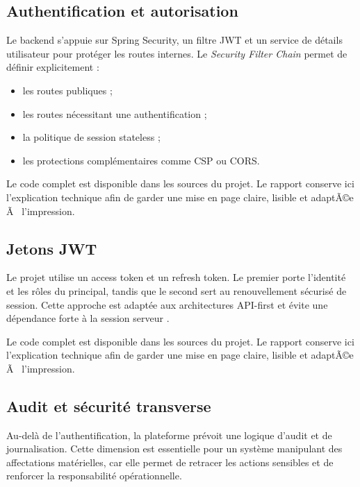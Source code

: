 ﻿\documentclass[12pt,a4paper,oneside]{report}
\newenvironment{codeblock}[1][]{
  \par
  \captionsetup{type=figure}
}{
  \par
}
\begin{document}
\subsection{Authentification et autorisation}
Le backend s'appuie sur Spring Security, un filtre JWT et un service de détails utilisateur pour protéger les routes internes. Le \textit{Security Filter Chain} permet de définir explicitement :
\begin{itemize}
  \item les routes publiques ;
  \item les routes nécessitant une authentification ;
  \item la politique de session stateless ;
  \item les protections complémentaires comme CSP ou CORS.
\end{itemize}

\begin{codeblock}[H]
\caption{Configuration de sécurité du backend}
\begin{keybox}
Le code complet est disponible dans les sources du projet. Le rapport conserve ici l'explication technique afin de garder une mise en page claire, lisible et adaptÃ©e Ã  l'impression.
\end{keybox}
\end{codeblock}

\subsection{Jetons JWT}
Le projet utilise un access token et un refresh token. Le premier porte l'identité et les rôles du principal, tandis que le second sert au renouvellement sécurisé de session. Cette approche est adaptée aux architectures API-first et évite une dépendance forte à la session serveur \cite{owasp2021}.

\begin{codeblock}[H]
\caption{Génération des jetons JWT}
\begin{keybox}
Le code complet est disponible dans les sources du projet. Le rapport conserve ici l'explication technique afin de garder une mise en page claire, lisible et adaptÃ©e Ã  l'impression.
\end{keybox}
\end{codeblock}

\subsection{Audit et sécurité transverse}
Au-delà de l'authentification, la plateforme prévoit une logique d'audit et de journalisation. Cette dimension est essentielle pour un système manipulant des affectations matérielles, car elle permet de retracer les actions sensibles et de renforcer la responsabilité opérationnelle.
\end{document}
